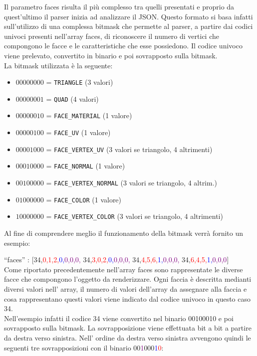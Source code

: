Il parametro faces risulta il più complesso tra quelli presentati e proprio da quest’ultimo il parser inizia ad analizzare il JSON.
Questo formato si basa infatti sull’utilizzo di una complessa bitmask che permette al parser, a partire dai codici univoci presenti nell’array faces, di riconoscere il numero di vertici che compongono le facce e le caratteristiche che esse possiedono. 
Il codice univoco viene prelevato, convertito in  binario e poi sovrapposto sulla bitmask.
\\
La bitmask utilizzata è la seguente:
\begin{itemize}
\item $00 00 00 00$ = \texttt{TRIANGLE} (3 valori)
\item $00 00 00 01$ = \texttt{QUAD} (4 valori)
\item $00 00 00 10$ = \texttt{FACE\_MATERIAL} (1 valore)
\item $00 00 01 00$ = \texttt{FACE\_UV} (1 valore)
\item $00 00 10 00$ = \texttt{FACE\_VERTEX\_UV} (3 valori se triangolo, 4 altrimenti)
\item $00 01 00 00$ = \texttt{FACE\_NORMAL} (1 valore)
\item $00 10 00 00$ = \texttt{FACE\_VERTEX\_NORMAL} (3 valori se triangolo, 4 altrim.)
\item $01 00 00 00$ = \texttt{FACE\_COLOR} (1 valore)
\item $10 00 00 00$ = \texttt{FACE\_VERTEX\_COLOR} (3 valori se triangolo, 4 altrimenti)
\end{itemize}
Al fine di comprendere meglio il funzionamento della bitmask verrà fornito un esempio:

``faces'' : [34,\textcolor{red}{0,1,2,}\textcolor{blue}{0,}\textcolor{purple}{0,0,0,}    34,\textcolor{red}{3,0,2,}\textcolor{blue}{0,}\textcolor{purple}{0,0,0,}    34,\textcolor{red}{4,5,6,}\textcolor{blue}{1,}\textcolor{purple}{0,0,0,}   34,\textcolor{red}{6,4,5,}\textcolor{blue}{1,}\textcolor{purple}{0,0,0}]
\\
Come riportato precedentemente nell’array faces sono rappresentate le diverse facce che compongono l’oggetto da renderizzare.
Ogni faccia è descritta medianti diversi valori nell’ array, il numero di valori dell’array da assegnare alla faccia e cosa rappresentano questi valori viene indicato dal codice univoco in questo caso 34.
\\
Nell’esempio infatti il codice 34 viene convertito nel binario 00100010 e poi sovrapposto sulla bitmask. La sovrapposizione viene effettuata bit a bit a partire da destra verso sinistra.
Nell’ ordine da destra verso sinistra avvengono quindi le seguenti tre sovrapposizioni con il binario 00\textcolor{purple}{1}000\textcolor{blue}{1}\textcolor{red}{0}:

